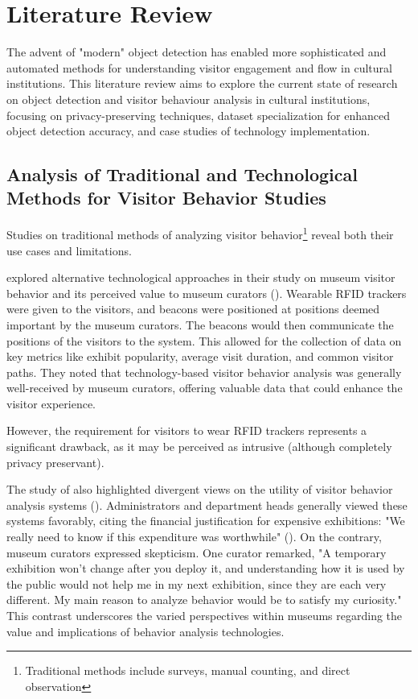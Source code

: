 \section{Literature Review}
The advent of "modern" object detection has enabled more sophisticated and automated methods for understanding visitor engagement and flow in cultural institutions. This literature review aims to explore the current state of research on object detection and visitor behaviour analysis in cultural institutions, focusing on privacy-preserving techniques, dataset specialization for enhanced object detection accuracy, and case studies of technology implementation.

\subsection{Analysis of Traditional and Technological Methods for Visitor Behavior Studies}

Studies on traditional methods of analyzing visitor behavior\footnote{Traditional methods include surveys, manual counting, and direct observation} reveal both their use cases and limitations.

\citeauthor{la2017museumbehaviouranalysis} explored alternative technological approaches in their study on museum visitor behavior and its perceived value to museum curators (\citeyear{la2017museumbehaviouranalysis}). Wearable RFID trackers were given to the visitors, and beacons were positioned at positions deemed important by the museum curators. The beacons would then communicate the positions of the visitors to the system. This allowed for the collection of data on key metrics like exhibit popularity, average visit duration, and common visitor paths. They noted that technology-based visitor behavior analysis was generally well-received by museum curators, offering valuable data that could enhance the visitor experience.

However, the requirement for visitors to wear RFID trackers represents a significant drawback, as it may be perceived as intrusive (although completely privacy preservant).

The study of \citeauthor{la2017museumbehaviouranalysis} also highlighted divergent views on the utility of visitor behavior analysis systems (\citeyear{la2017museumbehaviouranalysis}). Administrators and department heads generally viewed these systems favorably, citing the financial justification for expensive exhibitions: "We really need to know if this expenditure was worthwhile" (\cite{la2017museumbehaviouranalysis}). On the contrary, museum curators expressed skepticism. One curator remarked, "A temporary exhibition won’t change after you deploy it, and understanding how it is used by the public would not help me in my next exhibition, since they are each very different. My main reason to analyze behavior would be to satisfy my curiosity." This contrast underscores the varied perspectives within museums regarding the value and implications of behavior analysis technologies.

